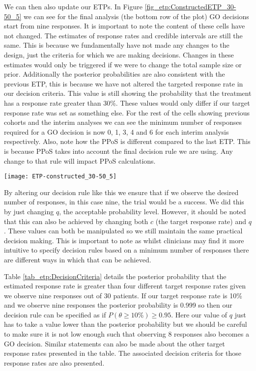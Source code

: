 We can then also update our ETPs. In Figure \ref{fig_etp:ConstructedETP_30-50_5} we can see for the final analysis (the bottom row of the plot) GO decisions start from nine responses. It is important to note the content of these cells have not changed. The estimates of response rates and credible intervals are still the same. This is because we fundamentally have not made any changes to the design, just the criteria for which we are making decisions. Changes in these estimates would only be triggered if we were to change the total sample size or prior. Additionally the posterior probabilities are also consistent with the previous ETP, this is because we have not altered the targeted response rate in our decision criteria. This value is still showing the probability that the treatment has a response rate greater than 30\%. These values would only differ if our target response rate was set as something else. For the rest of the cells showing previous cohorts and the interim analyses we can see the minimum number of responses required for a GO decision is now 0, 1, 3, 4 and 6 for each interim analysis respectively. Also, note how the PPoS is different compared to the last ETP. This is because PPoS takes into account the final decision rule we are using. Any change to that rule will impact PPoS calculations. 

\begin{sidewaysfigure}
	\centering
	\caption{ETP with updated final decision rule.}
	\label{fig_etp:ConstructedETP_30-50_5}
	\texttt{[image: ETP-constructed\_30-50\_5]}
\end{sidewaysfigure}

By altering our decision rule like this we ensure that if we observe the desired number of responses, in this case nine, the trial would be a success. We did this by just changing $q$, the acceptable probability level. However, it should be noted that this can also be achieved by changing both $c$ (the target response rate) and $q$. These values can both be manipulated so we still maintain the same practical decision making. This is important to note as whilst clinicians may find it more intuitive to specify decision rules based on a minimum number of responses there are different ways in which that can be achieved. 

Table \ref{tab_etp:DecisionCriteria} details the posterior probability that the estimated response rate is greater than four different target response rates given we observe nine responses out of 30 patients. If our target response rate is 10\% and we observe nine responses the posterior probability is 0.999 so then our decision rule can be specified as if $P(\theta  \geq 10\%) \geq 0.95$. Here our value of $q$ just has to take a value lower than the posterior probability but we should be careful to make sure it is not low enough such that observing 8 responses also becomes a GO decision. Similar statements can also be made about the other target response rates presented in the table. The associated decision criteria for those response rates are also presented. 

